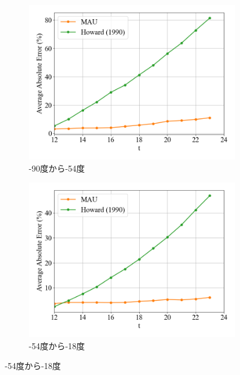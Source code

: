           \begin{figure}[htbp]
            \begin{subfigure}{0.5\textwidth}
              \centering
              \includegraphics[width=\textwidth]{figures/exp1/lng_error_1.png}
              \caption{-90度から-54度}
              \label{fig:exp1_lng_error_1}
            \end{subfigure}
            \begin{subfigure}{0.5\textwidth}
              \centering
              \includegraphics[width=\textwidth]{figures/exp1/lng_error_2.png}
              \caption{-54度から-18度}
              \label{fig:exp1_lng_error_2}
            \end{subfigure} \par

\end{figure}
